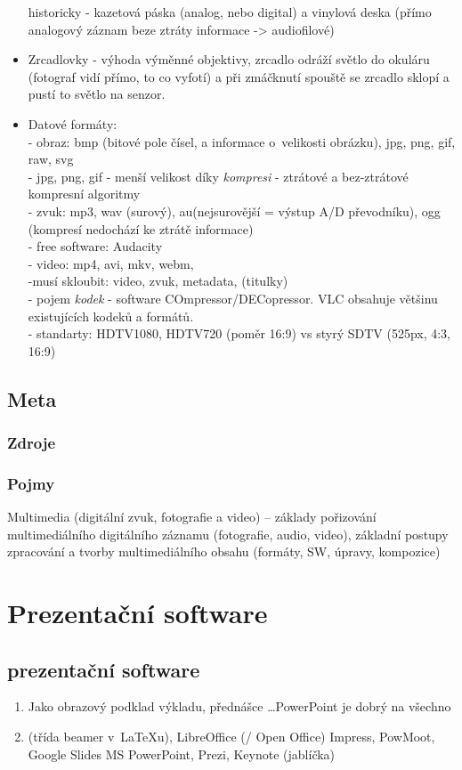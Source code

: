 \documentclass[12pt]{article}
\begin{document}
\begin{itemize}
historicky - kazetová páska (analog, nebo digital) a vinylová deska (přímo analogový záznam beze ztráty informace -> audiofilové)
\item Zrcadlovky - výhoda výměnné objektivy, zrcadlo odráží světlo do okuláru (fotograf vidí přímo, to co vyfotí) a při zmáčknutí spouště se zrcadlo sklopí a pustí to světlo na senzor.
\item Datové formáty:\\
 - obraz: bmp (bitové pole čísel, a informace o~velikosti obrázku), jpg, png, gif, raw, svg\\
  -	jpg, png, gif - menší velikost díky \emph{kompresi} - ztrátové a bez-ztrátové kompresní algoritmy\\
 - zvuk: mp3, wav (surový), au(nejsurovější = výstup A/D převodníku),  ogg (kompresí nedochází ke ztrátě informace)\\
 - free software: Audacity\\
 - video: mp4, avi, mkv, webm,\\
  -musí skloubit: video, zvuk, metadata, (titulky)\\
  - pojem \emph{kodek} - software COmpressor/DECopressor. VLC obsahuje většinu existujících kodeků a formátů.\\
  - standarty: HDTV1080, HDTV720 (poměr 16:9) vs styrý SDTV (525px, 4:3, 16:9)   
\end{itemize}

\subsection{Meta}
\subsubsection{Zdroje}
\subsubsection{Pojmy}
Multimedia (digitální zvuk, fotografie a video) – základy pořizování multimediálního digitálního záznamu (fotografie, audio, video), základní postupy zpracování a tvorby multimediálního obsahu (formáty, SW, úpravy, kompozice)

\section{Prezentační software}
\subsection{prezentační software}
\begin{enumerate}
\item Jako obrazový podklad výkladu, přednášce \dots PowerPoint je dobrý na všechno
\item (třída beamer v~\LaTeX u), LibreOffice (/ Open Office) Impress, PowMoot, Google Slides MS PowerPoint, Prezi, Keynote (jablíčka)
\end{enumerate}
\end{document}
